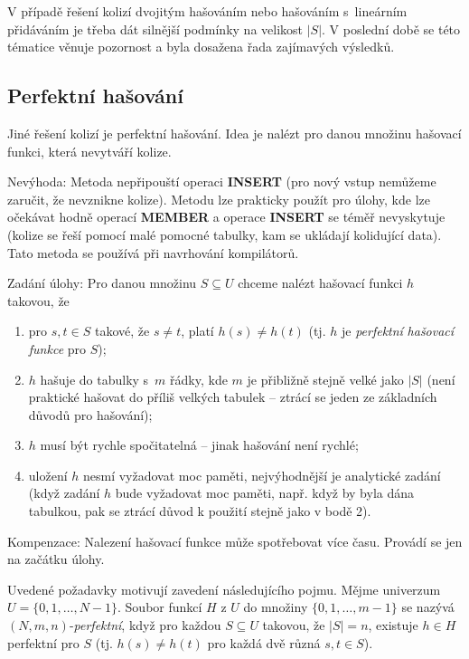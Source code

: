 \documentclass[a4paper,12pt]{article}
\begin{document}
V případě řešení 
kolizí dvojitým hašováním nebo hašováním s~lineárním přidáváním je třeba dát silnější podmínky na velikost $
|S|$. V poslední době se této tématice 
věnuje pozornost a byla dosažena řada zajímavých výsledků.

\subsection{Perfektní hašování}

Jiné řešení kolizí je perfektní hašování. Idea 
je nalézt pro danou množinu hašovací funkci, která 
nevytváří kolize.

Nevýhoda: Metoda nepřipouští operaci {\bf INSERT }
(pro nový vstup nemůžeme zaručit, že nevznikne  
kolize). Metodu lze prakticky použít pro úlohy, kde lze 
očekávat hodně operací {\bf MEMBER} a operace {\bf INSERT} se 
téměř nevyskytuje (kolize se řeší pomocí malé pomocné 
tabulky, kam se ukládají kolidují\-cí data). Tato metoda se 
používá při navrhování kompilátorů.

Zadání úlohy: Pro danou množinu $S\subseteq 
U$ chceme 
nalézt hašo\-va\-cí funkci $h$ takovou, že
\begin{enumerate}
\item
pro $s,t\in S$ takové, že $s\ne t$, platí $h(s)\ne h(t)$ (tj. $
h$ je \emph{perfektní} \emph{hašovací} \emph{funkce} pro 
$S$); 
\item
$h$ hašuje do tabulky s~$m$ řádky, kde $m$ je přibližně 
stejně velké jako $|S|$ (není praktické hašovat do příliš 
velkých tabulek -- ztrácí se jeden ze základních 
důvodů pro hašování); 
\item
$h$ musí být rychle spočitatelná -- jinak hašování 
není rychlé;
\item
uložení $h$ nesmí vyžadovat moc paměti, 
nejvýhodnější je ana\-lytické zadání (když zadání $
h$ bude 
vyžadovat moc paměti, např. když by byla dána tabulkou, 
pak se ztrácí důvod k použití stejně jako v 
bodě 2).
\end{enumerate}

Kompenzace: Nalezení hašovací funkce 
může spotřebovat více času. Provádí se jen na 
začátku úlohy. 

Uvedené požadavky motivují zavedení 
následujícího pojmu.\newline 
Mějme univerzum $U=\{0,1,\dots,N-1\}$. Soubor funkcí $H$ z 
$U$ do množiny $\{0,1,\dots,m-1\}$ se nazývá 
$(N,m,n)$-\emph{perfektní}, když pro každou $S\subseteq 
U$ 
takovou, že $|S|=n$, existuje $h\in H$ perfektní pro $S$ (tj. 
$h(s)\ne h(t)$ pro každá dvě různá $s,t\in S$).
\end{document}
